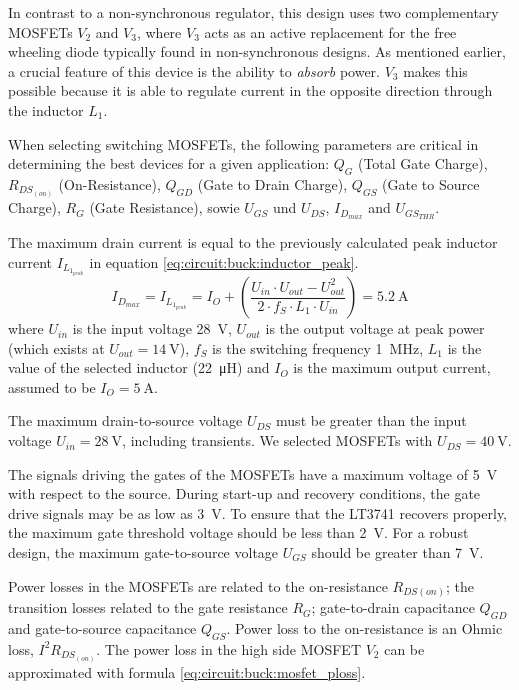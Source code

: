 In contrast to a non-synchronous regulator, this design uses  two  complementary
MOSFETs $V_2$ and $V_3$, where $V_3$ acts as an active replacement for the  free
wheeling diode typically found in non-synchronous designs. As mentioned earlier,
a crucial feature of  this  device  is the ability to \emph{absorb} power. $V_3$
makes  this  possible  because  it  is  able to regulate current in the opposite
direction through the inductor $L_1$.

When  selecting  switching  MOSFETs,  the  following  parameters are critical in
determining the best devices for a given application: $Q_G$ (Total Gate Charge),
$R_{DS_{(on)}}$ (On-Resistance), $Q_{GD}$ (Gate to Drain Charge), $Q_{GS}$ (Gate
to  Source  Charge),  $R_G$  (Gate  Resistance),  sowie  $U_{GS}$  und $U_{DS}$,
$I_{D_{max}}$ and $U_{GS_{THR}}$.

The maximum drain current is equal to the previously  calculated  peak  inductor
current $I_{L_{1_{peak}}}$ in equation \ref{eq:circuit:buck:inductor_peak}.
\begin{equation}
    I_{D_{max}} = I_{L_{1_{peak}}} = I_O + \left(\frac{U_{in}\cdot U_{out} - U_{out}^2}{2\cdot f_S \cdot L_1 \cdot U_{in}}\right) = \SI{5.2}{\ampere}
    \label{eq:circuit:buck:mosfet_id}
\end{equation}
where $U_{in}$ is the  input  voltage  \SI{28}{\volt},  $U_{out}$  is the output
voltage at peak power (which exists at $U_{out} = \SI{14}{\volt}$), $f_S$ is the
switching  frequency  \SI{1}{\mega\hertz},  $L_1$  is the value of the  selected
inductor (\SI{22}{\micro\henry})  and  $I_O$  is  the  maximum  output  current,
assumed to be $I_O = \SI{5}{\ampere}$.

The  maximum drain-to-source voltage $U_{DS}$ must be  greater  than  the  input
voltage $U_{in} = \SI{28}{\volt}$,  including  transients.  We  selected MOSFETs
with $U_{DS} = \SI{40}{\volt}$.

The  signals  driving  the  gates  of  the MOSFETs have  a  maximum  voltage  of
\SI{5}{\volt}  with   respect  to  the  source.  During  start-up  and  recovery
conditions, the gate drive signals  may  be  as  low as \SI{3}{\volt}. To ensure
that the LT3741 recovers properly, the  maximum gate threshold voltage should be
less than \SI{2}{\volt}. For a robust design, the maximum gate-to-source voltage
$U_{GS}$ should be greater than \SI{7}{\volt}.

Power losses in the MOSFETs are related to the on-resistance $R_{DS{(on)}}$; the
transition  losses  related  to  the  gate   resistance   $R_G$;   gate-to-drain
capacitance  $Q_{GD}$ and gate-to-source capacitance $Q_{GS}$. Power loss to the
on-resistance is an  Ohmic loss, $I^2 R_{DS_{(on)}}$. The power loss in the high
side     MOSFET     $V_2$      can      be     approximated     with     formula
\ref{eq:circuit:buck:mosfet_ploss}.

